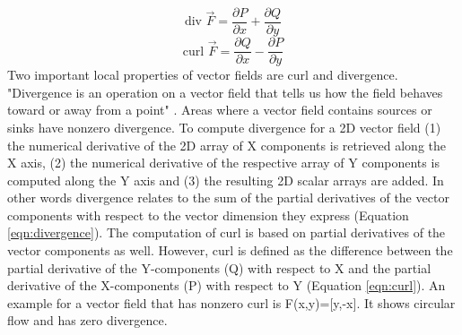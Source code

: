 \begin{equation}
  \text{div } \vec{F} = \frac{\partial P}{\partial x} + \frac{\partial Q}{\partial y}
\label{eqn:divergence}
\end{equation}
\begin{equation}
  \text{curl } \vec{F} = \frac{\partial Q}{\partial x} - \frac{\partial P}{\partial y}
\label{eqn:curl}
\end{equation}
Two important local properties of vector fields are curl and divergence. "Divergence is an operation on a vector field that tells us how the field behaves toward or away from a point" \parencite{strang2018divergence}. Areas where a vector field contains sources or sinks have nonzero divergence. To compute divergence for a 2D vector field (1) the numerical derivative of the 2D array of X components is retrieved along the X axis, (2) the numerical derivative of the respective array of Y components is computed along the Y axis and (3) the resulting 2D scalar arrays are added. In other words divergence relates to the sum of the partial derivatives of the vector components with respect to the vector dimension they express (Equation \ref{eqn:divergence}). The computation of curl is based on partial derivatives of the vector components as well. However, curl is defined as the difference between the partial derivative of the Y-components (Q) with respect to X and the partial derivative of the X-components (P) with respect to Y (Equation \ref{eqn:curl}). An example for a vector field that has nonzero curl is F(x,y)=[y,-x]. It shows circular flow and has zero divergence.\\
